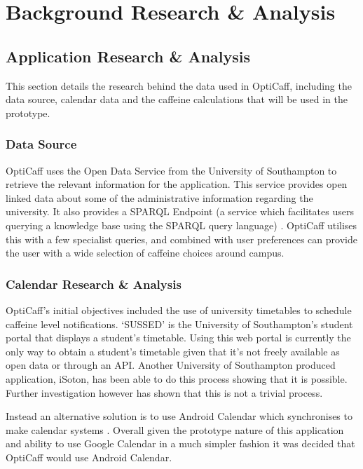 \section{Background Research \& Analysis}

\subsection{Application Research \& Analysis}
This section details the research behind the data used in OptiCaff, including the data source, calendar data and the caffeine calculations that will be used in the prototype. 

\subsubsection{Data Source}
\label{sec:Data}
OptiCaff uses the Open Data Service from the University of Southampton \cite{DataSouthampton} to retrieve the relevant information for the application. This service provides open linked data about some of the administrative information regarding the university. It also provides a SPARQL Endpoint \cite{SotonSparql} (a service which facilitates users querying a knowledge base using the SPARQL query language) \cite{SparqlEndpoint}. OptiCaff utilises this with a few specialist queries, and combined with user preferences can provide the user with a wide selection of caffeine choices around campus. 

\subsubsection{Calendar Research \& Analysis}
\label{sec:calendar}
OptiCaff’s initial objectives included the use of university timetables to schedule caffeine level notifications. 
`SUSSED' is the University of Southampton's student portal that displays a student’s timetable. 
Using this web portal is currently the only way to obtain a student's timetable given that it's not freely available as open data or through an API. 
Another University of Southampton produced application, iSoton, has been able to do this process showing that it is possible.
Further investigation however has shown that this is not a trivial process. 

Instead an alternative solution is to use Android Calendar which synchronises to make calendar systems \cite{calendar}.
Overall given the prototype nature of this application and ability to use Google Calendar in a much simpler fashion it was decided that OptiCaff would use Android Calendar. 

